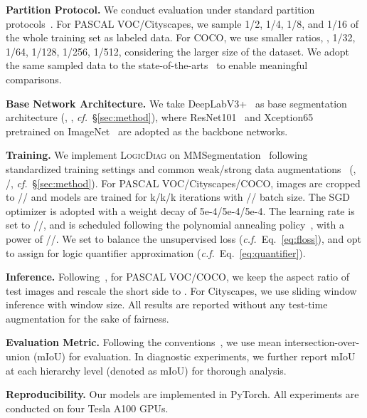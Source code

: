 \documentclass[10pt,twocolumn,letterpaper]{article}
\def\Ours{{\textsc{LogicDiag}}}
\begin{document}
\noindent\textbf{Partition Protocol.} We conduct evaluation under standard partition protocols~\cite{zhong2021pixel,wang2022semi}. For PASCAL VOC/Cityscapes, we sample 1/2, 1/4, 1/8, and 1/16 of the whole training set as labeled data. For COCO, we use smaller ratios, \ie, 1/32, 1/64, 1/128, 1/256, 1/512, considering the larger size of the dataset. We adopt the same sampled data to the state-of-the-arts~\cite{wang2022semi,zou2020pseudoseg} to enable meaningful comparisons.


\noindent\textbf{Base Network Architecture.} We take DeepLabV3+~\cite{chen2018encoder} as base segmentation architecture (\ie, , \textit{cf.\!}~\S\ref{sec:method}), where ResNet101~\cite{he2016deep} and Xception65~\cite{chollet2017xception} pretrained on ImageNet~\cite{deng2009imagenet} are adopted as the backbone networks.

\noindent\textbf{Training.} We implement {\Ours} on MMSegmentation~\cite{mmseg2020} following standardized training settings and common weak/strong data augmentations~\cite{yuan2022semi,wang2022semi,yang2021st++} (\ie, /, \textit{cf.\!}~\S\ref{sec:method}). For PASCAL VOC/Cityscapes/COCO, images are cropped to // and models are trained for k/k/k iterations with // batch size. The SGD optimizer is adopted with a weight decay of {5e-4}/{5e-4}/{5e-4}. The learning rate is set to //, and is scheduled following the polynomial annealing policy~\cite{chen2017rethinking}, with a power of //.
We set  to balance the unsupervised loss (\textit{c.f.}~Eq.~\ref{eq:floss}), and opt to assign  for logic quantifier approximation (\textit{c.f.}~Eq.~\ref{eq:quantifier}).


\noindent\textbf{Inference.} Following~\cite{zhong2021pixel,yuan2022semi}, for PASCAL VOC/COCO, we keep the aspect ratio of test images and rescale the short side to . For Cityscapes, we use sliding window inference with  window size. All results are reported without any test-time augmentation for the sake of fairness.

\noindent\textbf{Evaluation Metric.} Following the conventions~\cite{wang2022semi,chen2021semi}, we use mean intersection-over-union (mIoU) for evaluation. In diagnostic experiments, we further report mIoU at each hierarchy level  (denoted as mIoU) for thorough analysis.


\noindent\textbf{Reproducibility.}
Our models are implemented in PyTorch. All experiments are conducted on four Tesla A100 GPUs. 
\end{document}

